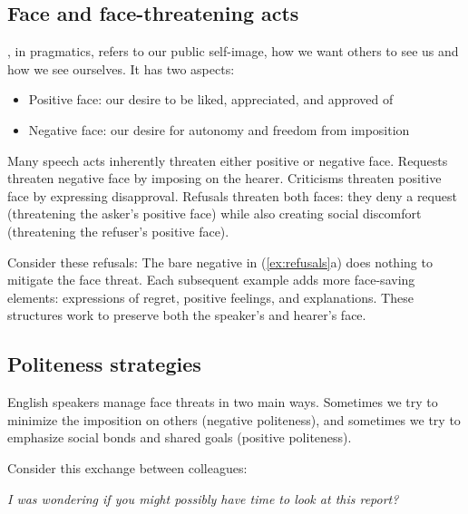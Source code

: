 \subsection{Face and face-threatening acts}

, in pragmatics, refers to our public self-image, how we want others to see us and how we see ourselves. It has two aspects:
\begin{itemize}[noitemsep]
    \item Positive face: our desire to be liked, appreciated, and approved of 
    \item Negative face: our desire for autonomy and freedom from imposition 
\end{itemize}

Many speech acts inherently threaten either positive or negative face. Requests threaten negative face by imposing on the hearer. Criticisms threaten positive face by expressing disapproval. Refusals threaten both faces: they deny a request (threatening the asker's positive face) while also creating social discomfort (threatening the refuser's positive face).

Consider these refusals:
\ea \label{ex:refusals}
    \z
\z
The bare negative in (\ref{ex:refusals}a) does nothing to mitigate the face threat. Each subsequent example adds more face-saving elements: expressions of regret, positive feelings, and explanations. These structures work to preserve both the speaker's and hearer's face.

\subsection{Politeness strategies}

English speakers manage face threats in two main ways. Sometimes we try to minimize the imposition on others (negative politeness), and sometimes we try to emphasize social bonds and shared goals (positive politeness).

Consider this exchange between colleagues:

\begin{dialogue}
\item[A] \textit{I was wondering if you might possibly have time to look at this report?}
\item[B] 
\end{dialogue}

